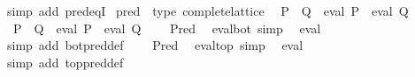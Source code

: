 \begin{isabellebody}
\isamarkupfalse%
\ {\isacharparenleft}{\kern0pt}simp\ add{\isacharcolon}{\kern0pt}\ pred{\isacharunderscore}{\kern0pt}eqI{\isacharparenright}{\kern0pt}%
\endisatagproof
{\isafoldproof}%
%
\isadelimproof
\isanewline
%
\endisadelimproof
\isanewline
{}\isamarkupfalse%
\ pred\ {\isacharcolon}{\kern0pt}{\isacharcolon}{\kern0pt}\ {\isacharparenleft}{\kern0pt}type{\isacharparenright}{\kern0pt}\ complete{\isacharunderscore}{\kern0pt}lattice\isanewline
{}\isanewline
\isanewline
{}\isamarkupfalse%
\isanewline
\ \ {\isachardoublequoteopen}P\ {\isasymle}\ Q\ {\isasymlongleftrightarrow}\ eval\ P\ {\isasymle}\ eval\ Q{\isachardoublequoteclose}\isanewline
\isanewline
{}\isamarkupfalse%
\isanewline
\ \ {\isachardoublequoteopen}P\ {\isacharless}{\kern0pt}\ Q\ {\isasymlongleftrightarrow}\ eval\ P\ {\isacharless}{\kern0pt}\ eval\ Q{\isachardoublequoteclose}\isanewline
\isanewline
{}\isamarkupfalse%
\isanewline
\ \ {\isachardoublequoteopen}{\isasymbottom}\ {\isacharequal}{\kern0pt}\ Pred\ {\isasymbottom}{\isachardoublequoteclose}\isanewline
\isanewline
{}\isamarkupfalse%
\ eval{\isacharunderscore}{\kern0pt}bot\ {\isacharbrackleft}{\kern0pt}simp{\isacharbrackright}{\kern0pt}{\isacharcolon}{\kern0pt}\isanewline
\ \ {\isachardoublequoteopen}eval\ {\isasymbottom}\ \ {\isacharequal}{\kern0pt}\ {\isasymbottom}{\isachardoublequoteclose}\isanewline
%
\isadelimproof
\ \ %
\endisadelimproof
%
\isatagproof
{}\isamarkupfalse%
\ {\isacharparenleft}{\kern0pt}simp\ add{\isacharcolon}{\kern0pt}\ bot{\isacharunderscore}{\kern0pt}pred{\isacharunderscore}{\kern0pt}def{\isacharparenright}{\kern0pt}%
\endisatagproof
{\isafoldproof}%
%
\isadelimproof
\isanewline
%
\endisadelimproof
\isanewline
{}\isamarkupfalse%
\isanewline
\ \ {\isachardoublequoteopen}{\isasymtop}\ {\isacharequal}{\kern0pt}\ Pred\ {\isasymtop}{\isachardoublequoteclose}\isanewline
\isanewline
{}\isamarkupfalse%
\ eval{\isacharunderscore}{\kern0pt}top\ {\isacharbrackleft}{\kern0pt}simp{\isacharbrackright}{\kern0pt}{\isacharcolon}{\kern0pt}\isanewline
\ \ {\isachardoublequoteopen}eval\ {\isasymtop}\ \ {\isacharequal}{\kern0pt}\ {\isasymtop}{\isachardoublequoteclose}\isanewline
%
\isadelimproof
\ \ %
\endisadelimproof
%
\isatagproof
{}\isamarkupfalse%
\ {\isacharparenleft}{\kern0pt}simp\ add{\isacharcolon}{\kern0pt}\ top{\isacharunderscore}{\kern0pt}pred{\isacharunderscore}{\kern0pt}def{\isacharparenright}{\kern0pt}%
\endisatagproof
{\isafoldproof}%

\end{isabellebody}

